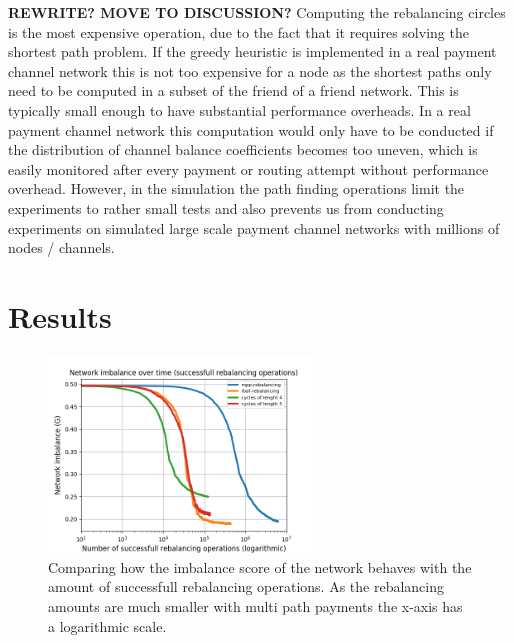 \documentclass[a4paper]{paper}
\begin{document}
\textbf{REWRITE? MOVE TO DISCUSSION?} Computing the rebalancing circles is the most expensive operation, due to the fact that it requires solving the shortest path problem.
If the greedy heuristic is implemented in a real payment channel network this is not too expensive for a node as the shortest paths only need to be computed in a subset of the friend of a friend network.
This is typically small enough to have substantial performance overheads. 
In a real payment channel network this computation would only have to be conducted 
if the distribution of channel balance coefficients becomes too uneven,
which is easily monitored after every payment or routing attempt without performance overhead.
However, in the simulation the path finding operations limit the experiments to rather small tests and also prevents us from conducting experiments on simulated large scale payment channel networks with millions of nodes / channels.

 
\section{Results}
\label{sec:results}

\begin{figure}
 \centering
 \includegraphics[width=7cm]{code/vs/fig/imba_vs_steps.png}
 \caption{Comparing how the imbalance score of the network behaves with the amount of successfull rebalancing operations. As the rebalancing amounts are much smaller with multi path payments the x-axis has a logarithmic scale.}
 \label{fig:imbalancehovertime}
\end{figure}
\end{document}
